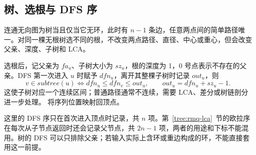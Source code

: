 \subsection{树、选根与 DFS 序}
\label{math:tree-basics}
连通无向图为树当且仅当它无环，此时有 $n-1$ 条边，任意两点间的简单路径唯一。对同一棵无根树选不同的根，不改变两点路径、直径、中心或重心，但会改变父亲、深度、子树和 LCA。

选根后，记父亲为 $fa_u$、子树大小为 $sz_u$，根的深度为 1，0 号点表示不存在的父亲。DFS 第一次进入 $u$ 时赋予 $dfn_u$，离开其整棵子树时记录 $out_u$，则
\[
    v\in subtree(u)\iff dfn_u\le dfn_v\le out_u,
    \qquad out_u=dfn_u+sz_u-1.
\]
这使子树对应一个连续区间；普通路径通常不连续，需要 LCA、差分或树链剖分进一步处理。 将序列位置映射回顶点。

这里的 DFS 序只在首次进入顶点时记录，共 $n$ 项。第~\ref{tree:rmq-lca}~节的欧拉序在每次从子节点返回时还会记录父节点，共 $2n-1$ 项，两者的用途和下标不能混用。树的 DFS 可以只排除父亲；若输入实际上含环或重边构成的环，不能直接套用这一前提。
